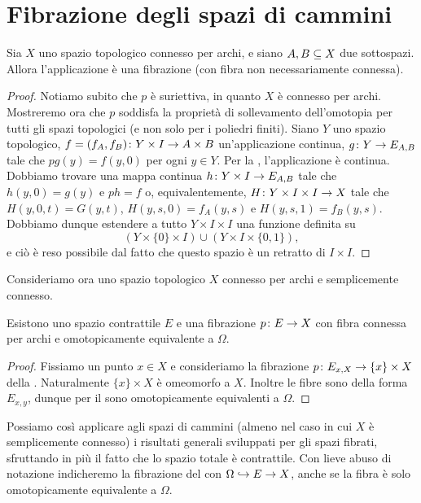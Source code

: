 \section{Fibrazione degli spazi di cammini}
\begin{proposition}
Sia $X$ uno spazio topologico connesso per archi, e siano $A,B\subseteq X$ due sottospazi. Allora l'applicazione
è una fibrazione (con fibra non necessariamente connessa).
\end{proposition}
\begin{proof}
Notiamo subito che $p$ è suriettiva, in quanto $X$ è connesso per archi. Mostreremo ora che $p$ soddisfa la proprietà di sollevamento dell'omotopia per tutti gli spazi topologici (e non solo per i poliedri finiti). Siano $Y$ uno spazio topologico, $\map{f=(f_A,f_B)}{Y\times I}{A\times B}$ un'applicazione continua, $\map{g}{Y}{E_{A,B}}$ tale che $pg(y)=f(y,0)$ per ogni $y\in Y$. Per la , l'applicazione
è continua. Dobbiamo trovare una mappa continua $\map{h}{Y\times I}{E_{A,B}}$ tale che $h(y,0)=g(y)$ e $ph=f$ o, equivalentemente, $\map{H}{Y\times I\times I}{X}$ tale che $H(y,0,t)=G(y,t)$, $H(y,s,0)=f_A(y,s)$ e $H(y,s,1)=f_B(y,s)$. Dobbiamo dunque estendere a tutto $Y\times I\times I$ una funzione definita su
$$
(Y\times\{0\}\times I)\cup(Y\times I\times \{0,1\}),
$$
e ciò è reso possibile dal fatto che questo spazio è un retratto di $I\times I$.
\end{proof}

Consideriamo ora uno spazio topologico $X$ connesso per archi e semplicemente connesso.

\begin{corollary}
Esistono uno spazio contrattile $E$ e una fibrazione $\map{p}{E}{X}$ con fibra connessa per archi e omotopicamente equivalente a $\Omega$.
\end{corollary}
\begin{proof}
Fissiamo un punto $x\in X$ e consideriamo la fibrazione $\map{p}{E_{x,X}}{\{x\}\times X}$ della . Naturalmente $\{x\}\times X$ è omeomorfo a $X$. Inoltre le fibre sono della forma $E_{x,y}$, dunque per il  sono omotopicamente equivalenti a $\Omega$.
\end{proof}

Possiamo così applicare agli spazi di cammini (almeno nel caso in cui $X$ è semplicemente connesso) i risultati generali sviluppati per gli spazi fibrati, sfruttando in più il fatto che lo spazio totale è contrattile. Con lieve abuso di notazione indicheremo la fibrazione del  con $\Omega\hookrightarrow E\to X$, anche se la fibra è solo omotopicamente equivalente a $\Omega$.

